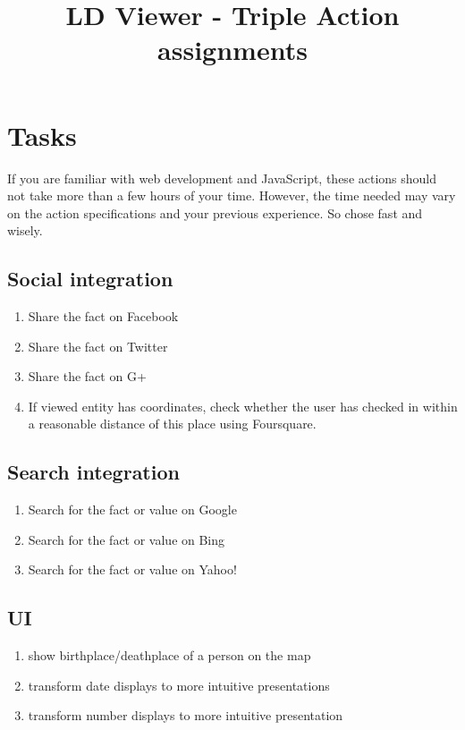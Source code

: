 \documentclass{article}
\begin{document}
\title{LD Viewer - Triple Action assignments}
\date{}
\maketitle



\section{Tasks}
If you are familiar with web development and JavaScript, these actions should not take more than a few hours of your time.
However, the time needed may vary on the action specifications and your previous experience. So chose fast and wisely.
\subsection{Social integration}
\begin{enumerate}
\item Share the fact on Facebook
\item Share the fact on Twitter
\item Share the fact on G+
\item If viewed entity has coordinates, check whether the user has checked in within a reasonable distance of this place using Foursquare.
\end{enumerate}

\subsection{Search integration}
\begin{enumerate}
\item Search for the fact or value on Google
\item Search for the fact or value on Bing
\item Search for the fact or value on Yahoo!
\end{enumerate}

\subsection{UI}
\begin{enumerate}
\item show birthplace/deathplace of a person on the map
\item transform date displays to more intuitive presentations
\item transform number displays to more intuitive presentation
\end{enumerate}
\end{document}

